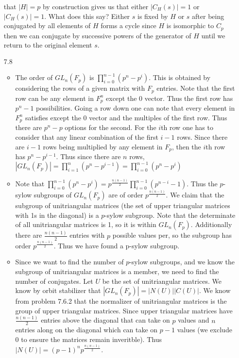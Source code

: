 \documentclass[12pt, letterpaper]{article}
\begin{document}
\begin{enumerate}
	that $|H| = p$ by construction gives us that either $|C_H(s)| = 1$ or $|C_H(s)| = 1$.  What does this say?  Either $s$ is fixed by $H$ or $s$ 
	after being conjugated by all elements of $H$ forms a cycle since $H$ 
	is isomorphic to $C_p$ then we can conjugate by successive powers of the generator of $H$ until we return to the original element $s$.    
	\item[7.8] 
	\begin{itemize}
		\item The order of $GL_n(F_p)$ is $\prod_{i=0}^{n-1}(p^n - p^i)$.  This is obtained by considering the rows of a given matrix with $F_p$ entries.  Note that the first row can be any element in $F_p^n$ except the 0 vector.  Thus the first row has $p^n-1$ possibilities.  Going a row down
		one can note that every element in $F_p^n$ satisfies except the 0 vector and the multiples of the first row.  Thus there are $p^n-p$ options 
		for the second.  For the $i$th row one has to consider that 
		any linear combination of the first $i-1$ rows.  Since there are 
		$i-1$ rows being multiplied by any element in $F_p$, then the $i$th row has $p^n-p^{i-1}$.  Thus since there are $n$ rows, $|GL_n(F_p)| = \prod_{i=1}^{n}(p^n - p^{i-1}) = \prod_{i=0}^{n-1}(p^n - p^i)$    
		\item Note that $\prod_{i=0}^{n-1}(p^n - p^i) = p^{\frac{n(n-1)}{2}}\prod_{i=0}^{n-1}(p^{n-i}-1)$.  Thus the $p$-sylow subgroups of $GL_n(F_p)$ are
		of order $p^{\frac{n(n-1)}{2}}$.  We claim that the subgroup of unitriangular matrices (the set of upper triangular matrices with 1s in the diagonal) is a $p$-sylow subgroup.  Note that the determinate of all unitriangular matrices is 1, so it is within $GL_n(F_p)$.  Additionally there are $\frac{n(n-1)}{2}$ entries with $p$ possible values per, so the subgroup has order $p^{\frac{n(n-1)}{2}}$.  Thus we have found a p-sylow subgroup.
		\item Since we want to find the number of $p$-sylow subgroups, and
		we know the subgroup of unitriangular matrices is a member, we need
		to find the number of conjugates.  Let $U$ be the set of unitriangular matrices.  We know by orbit stabilizer that $|GL_n(F_p)| = |N(U)||C(U)|$.  We know from problem 7.6.2 that the normalizer of unitriangular matrices is the group of upper triangular matrices.  
		Since upper triangular matrices have $\frac{n(n-1)}{2}$ entries above the diagonal that can take on $p$ values and $n$ entries along on the diagonal which can take on $p-1$ values (we exclude 0 to ensure the matrices remain inveritble).   Thus $|N(U)| = (p-1)^n p^{\frac{n(n-1)}{2}}$.  

\end{itemize}
\end{enumerate}
\end{document}
